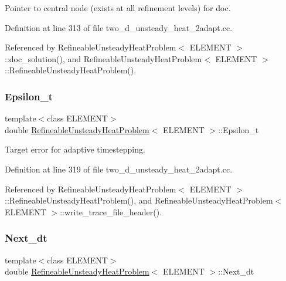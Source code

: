 Pointer to central node (exists at all refinement levels) for doc. 



Definition at line 313 of file two\+\_\+d\+\_\+unsteady\+\_\+heat\+\_\+2adapt.\+cc.



Referenced by Refineable\+Unsteady\+Heat\+Problem$<$ E\+L\+E\+M\+E\+N\+T $>$\+::doc\+\_\+solution(), and Refineable\+Unsteady\+Heat\+Problem$<$ E\+L\+E\+M\+E\+N\+T $>$\+::\+Refineable\+Unsteady\+Heat\+Problem().

\mbox{\label{classRefineableUnsteadyHeatProblem_a362673bcb46e93a27e3603fd228bd3d7}} 
\subsubsection{\texorpdfstring{Epsilon\+\_\+t}{Epsilon\_t}}
{\footnotesize\ttfamily template$<$class E\+L\+E\+M\+E\+NT$>$ \\
double \hyperlink{classRefineableUnsteadyHeatProblem}{Refineable\+Unsteady\+Heat\+Problem}$<$ E\+L\+E\+M\+E\+NT $>$\+::Epsilon\+\_\+t\hspace{0.3cm}{\ttfamily [private]}}



Target error for adaptive timestepping. 



Definition at line 319 of file two\+\_\+d\+\_\+unsteady\+\_\+heat\+\_\+2adapt.\+cc.



Referenced by Refineable\+Unsteady\+Heat\+Problem$<$ E\+L\+E\+M\+E\+N\+T $>$\+::\+Refineable\+Unsteady\+Heat\+Problem(), and Refineable\+Unsteady\+Heat\+Problem$<$ E\+L\+E\+M\+E\+N\+T $>$\+::write\+\_\+trace\+\_\+file\+\_\+header().

\mbox{\label{classRefineableUnsteadyHeatProblem_a2ffd16f7fe0fa56500f6dd730dc49bf3}} 
\subsubsection{\texorpdfstring{Next\+\_\+dt}{Next\_dt}}
{\footnotesize\ttfamily template$<$class E\+L\+E\+M\+E\+NT$>$ \\
double \hyperlink{classRefineableUnsteadyHeatProblem}{Refineable\+Unsteady\+Heat\+Problem}$<$ E\+L\+E\+M\+E\+NT $>$\+::Next\+\_\+dt\hspace{0.3cm}{\ttfamily [private]}}

